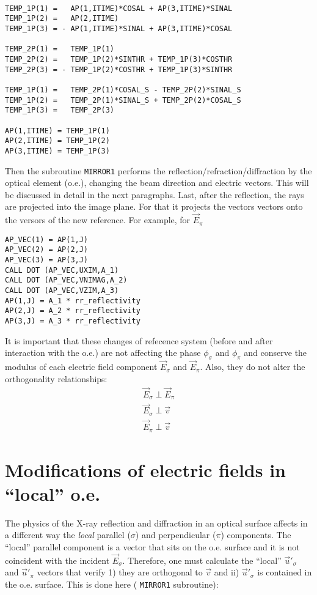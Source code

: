 \documentclass[a4paper,10pt]{article}
\begin{document}
\begin{lstlisting}
 
TEMP_1P(1) =   AP(1,ITIME)*COSAL + AP(3,ITIME)*SINAL
TEMP_1P(2) =   AP(2,ITIME)
TEMP_1P(3) = - AP(1,ITIME)*SINAL + AP(3,ITIME)*COSAL

TEMP_2P(1) =   TEMP_1P(1)
TEMP_2P(2) =   TEMP_1P(2)*SINTHR + TEMP_1P(3)*COSTHR
TEMP_2P(3) = - TEMP_1P(2)*COSTHR + TEMP_1P(3)*SINTHR

TEMP_1P(1) =   TEMP_2P(1)*COSAL_S - TEMP_2P(2)*SINAL_S
TEMP_1P(2) =   TEMP_2P(1)*SINAL_S + TEMP_2P(2)*COSAL_S
TEMP_1P(3) =   TEMP_2P(3)

AP(1,ITIME)	= TEMP_1P(1)
AP(2,ITIME)	= TEMP_1P(2)
AP(3,ITIME)	= TEMP_1P(3)
\end{lstlisting}

Then the subroutine {\tt MIRROR1} performs the reflection/refraction/diffraction by the optical element (o.e.), 
changing the beam direction and electric vectors. This will be discussed in detail in the next paragraphs.
Last, after the reflection, the rays are projected into the image plane. For that it projects the vectors 
vectors onto the versors of the new reference. For example, for $\vec{E}_\pi$

\begin{lstlisting}
AP_VEC(1) = AP(1,J)
AP_VEC(2) = AP(2,J)
AP_VEC(3) = AP(3,J)
CALL DOT (AP_VEC,UXIM,A_1)
CALL DOT (AP_VEC,VNIMAG,A_2)
CALL DOT (AP_VEC,VZIM,A_3)
AP(1,J) = A_1 * rr_reflectivity
AP(2,J) = A_2 * rr_reflectivity
AP(3,J) = A_3 * rr_reflectivity
\end{lstlisting}

It is important that these changes of refecence system (before and after interaction with the o.e.) 
are not affecting the phase $\phi_\sigma$ and $\phi_\pi$ and conserve the modulus of each electric field
component $\vec{E}_\sigma$ and $\vec{E}_\pi$. Also, they do not alter the orthogonality relationships:
\begin{eqnarray}
\label{ortho}
\vec{E}_\sigma \perp \vec{E}_\pi \nonumber \\
\vec{E}_\sigma \perp \vec{v} \nonumber \\
\vec{E}_\pi \perp \vec{v}
\end{eqnarray}

\section{Modifications of electric fields in ``local'' o.e.}

The physics of the X-ray reflection and diffraction in an optical surface affects in a different way 
the {\it local} parallel ($\sigma$) and perpendicular ($\pi$) components. The ``local'' parallel component
is a vector that sits on the o.e. surface and it is not coincident with the incident $\vec{E}_\sigma$.
Therefore, one must calculate the ``local'' $\vec{u}'_\sigma$ and $\vec{u}'_\pi$ vectors that verify
1) they are orthogonal to $\vec{v}$ and ii) $\vec{u}'_\sigma$ is contained in the o.e. surface. 
This is done here ( {\tt MIRROR1} subroutine):
\end{document}
